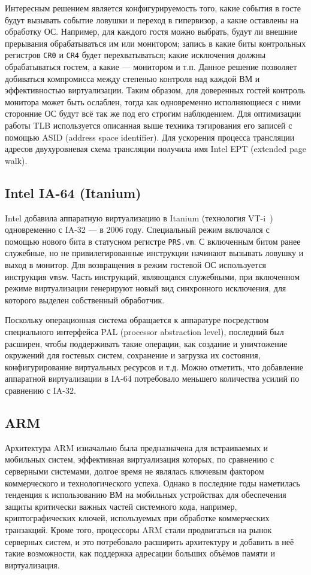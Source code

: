 Интересным решением является конфигурируемость того, какие события в госте будут вызывать событие ловушки и переход в гипервизор, а какие оставлены на обработку ОС. Например, для каждого гостя можно выбрать, будут ли внешние прерывания обрабатываться им или монитором; запись в какие биты контрольных регистров \texttt{CR0} и \texttt{CR4} будет перехватываться; какие исключения должны обрабатываться гостем, а какие — монитором и т.п. Данное решение позволяет добиваться компромисса между степенью контроля над каждой ВМ и эффективностью виртуализации. Таким образом, для доверенных гостей контроль монитора может быть ослаблен, тогда как одновременно исполняющиеся с ними сторонние ОС будут всё так же под его строгим наблюдением. Для оптимизации работы TLB используется описанная выше техника тэгирования его записей с помощью ASID (\abbr address space identifier). Для ускорения процесса трансляции адресов двухуровневая схема трансляции получила имя Intel EPT (\abbr extended page walk).

\subsection{Intel IA-64 (Itanium)}

Intel добавила аппаратную виртуализацию в Itanium (технология VT-i~\cite{vtx}) одновременно с IA-32 — в 2006 году. Специальный режим включался с помощью нового бита в статусном регистре \texttt{PRS.vm}. С включенным битом ранее служебные, но не привилегированные инструкции начинают вызывать ловушку и выход в монитор. Для возвращения в режим гостевой ОС используется инструкция \texttt{vmsw}. Часть инструкций, являющаяся служебными, при включенном режиме виртуализации генерируют новый вид синхронного исключения, для которого выделен собственный обработчик.

Поскольку операционная система обращается к аппаратуре посредством специального интерфейса PAL (\abbr processor abstraction level), последний был расширен, чтобы поддерживать такие операции, как создание и уничтожение окружений для гостевых систем, сохранение и загрузка их состояния, конфигурирование виртуальных ресурсов и т.д. Можно отметить, что добавление аппаратной виртуализации в IA-64 потребовало меньшего количества усилий по сравнению с IA-32.

\subsection{ARM}

Архитектура ARM изначально была предназначена для встраиваемых и мобильных систем, эффективная виртуализация которых, по сравнению с серверными системами, долгое время не являлась ключевым фактором коммерческого и технологического успеха. Однако в последние годы наметилась тенденция к использованию ВМ на мобильных устройствах для обеспечения защиты критически важных частей системного кода, например, криптографических ключей, используемых при обработке коммерческих транзакций. Кроме того, процессоры ARM стали продвигаться на рынок серверных систем, и это потребовало расширить архитектуру и добавить в неё такие возможности, как поддержка адресации больших объёмов памяти и виртуализация.


